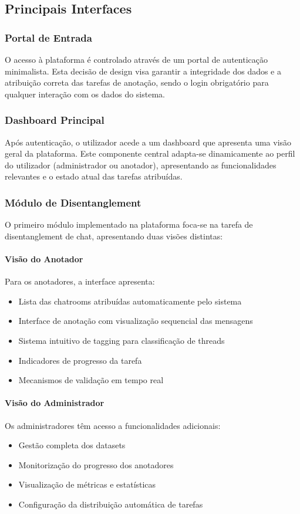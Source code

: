 \subsection{Principais Interfaces}

\subsubsection{Portal de Entrada}
O acesso à plataforma é controlado através de um portal de autenticação minimalista. Esta decisão de design visa garantir a integridade dos dados e a atribuição correta das tarefas de anotação, sendo o login obrigatório para qualquer interação com os dados do sistema.

\subsubsection{Dashboard Principal}
Após autenticação, o utilizador acede a um dashboard que apresenta uma visão geral da plataforma. Este componente central adapta-se dinamicamente ao perfil do utilizador (administrador ou anotador), apresentando as funcionalidades relevantes e o estado atual das tarefas atribuídas.

\subsubsection{Módulo de Disentanglement}
O primeiro módulo implementado na plataforma foca-se na tarefa de disentanglement de chat, apresentando duas visões distintas:

\paragraph{Visão do Anotador}
Para os anotadores, a interface apresenta:
\begin{itemize}
    \item Lista das chatrooms atribuídas automaticamente pelo sistema
    \item Interface de anotação com visualização sequencial das mensagens
    \item Sistema intuitivo de tagging para classificação de threads
    \item Indicadores de progresso da tarefa
    \item Mecanismos de validação em tempo real
\end{itemize}

\paragraph{Visão do Administrador}
Os administradores têm acesso a funcionalidades adicionais:
\begin{itemize}
    \item Gestão completa dos datasets
    \item Monitorização do progresso dos anotadores
    \item Visualização de métricas e estatísticas
    \item Configuração da distribuição automática de tarefas
\end{itemize}

